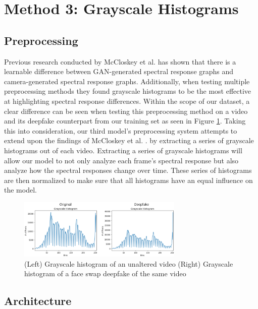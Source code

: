 \documentclass[a4paper]{article}
\begin{document}
\section{Method 3: Grayscale Histograms}

\subsection{Preprocessing}

Previous research conducted by McCloskey et al.\cite{Color_Cues} has shown that there is a learnable difference between GAN-generated spectral response graphs and camera-generated spectral response graphs. Additionally, when testing multiple preprocessing methods they found grayscale histograms to be the most effective at highlighting spectral response differences. Within the scope of our dataset, a clear difference can be seen when testing this preprocessing method on a video and its deepfake counterpart from our training set as seen in Figure \ref{fig:Grayscale_Histograms}. Taking this into consideration, our third model’s preprocessing system attempts to extend upon the findings of McCloskey et al.  \cite{Color_Cues}. by extracting a series of grayscale histograms out of each video. Extracting a series of grayscale histograms will allow our model to not only analyze each frame’s spectral response but also analyze how the spectral responses change over time. These series of histograms are then normalized to make sure that all histograms have an equal influence on the model.

\begin{figure}[ht]
\centering
\includegraphics[width=0.7\textwidth]{images/grayscale_histograms.png}
\caption{(Left) Grayscale histogram of an unaltered video (Right) Grayscale histogram of a face swap deepfake of the same video}
\label{fig:Grayscale_Histograms}
\end{figure}

\subsection{Architecture}
\end{document}
